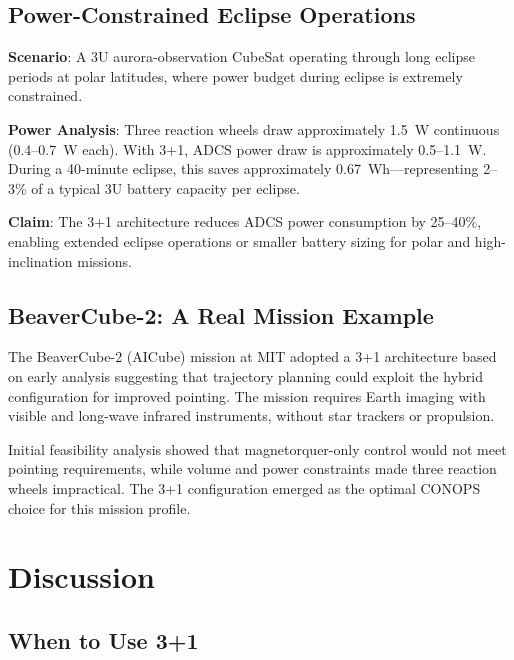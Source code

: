 \documentclass[9pt]{extarticle}
\begin{document}
\subsection{Power-Constrained Eclipse Operations}

\textbf{Scenario}: A 3U aurora-observation CubeSat operating through long eclipse periods at polar latitudes, where power budget during eclipse is extremely constrained.

\textbf{Power Analysis}: Three reaction wheels draw approximately 1.5~W continuous (0.4--0.7~W each). With 3+1, ADCS power draw is approximately 0.5--1.1~W. During a 40-minute eclipse, this saves approximately 0.67~Wh---representing 2--3\% of a typical 3U battery capacity per eclipse.

\textbf{Claim}: The 3+1 architecture reduces ADCS power consumption by 25--40\%, enabling extended eclipse operations or smaller battery sizing for polar and high-inclination missions.

\subsection{BeaverCube-2: A Real Mission Example}

The BeaverCube-2 (AICube) mission at MIT adopted a 3+1 architecture based on early analysis suggesting that trajectory planning could exploit the hybrid configuration for improved pointing. The mission requires Earth imaging with visible and long-wave infrared instruments, without star trackers or propulsion.

Initial feasibility analysis showed that magnetorquer-only control would not meet pointing requirements, while volume and power constraints made three reaction wheels impractical. The 3+1 configuration emerged as the optimal CONOPS choice for this mission profile.



\section{Discussion}\label{sec:discussion}

\subsection{When to Use 3+1}
\end{document}
